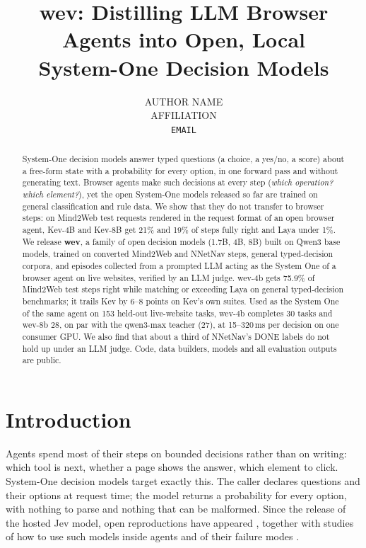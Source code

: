 \documentclass[11pt]{article}
\title{wev: Distilling LLM Browser Agents into Open, Local\\System-One Decision Models}
\author{AUTHOR NAME\\AFFILIATION\\\texttt{EMAIL}}
\date{}
\begin{document}
\maketitle

\begin{abstract}
System-One decision models answer typed questions (a choice, a yes/no, a score) about a free-form state with a
probability for every option, in one forward pass and without generating text. Browser agents make such decisions at
every step (\emph{which operation? which element?}), yet the open System-One models released so far are trained on
general classification and rule data. We show that they do not transfer to browser steps: on Mind2Web test requests
rendered in the request format of an open browser agent, Kev-4B and Kev-8B get 21\% and 19\% of steps fully right and
Laya under 1\%. We release \textbf{wev}, a family of open decision models (1.7B, 4B, 8B) built on Qwen3 base models,
trained on converted Mind2Web and NNetNav steps, general typed-decision corpora, and episodes collected from a
prompted LLM acting as the System One of a browser agent on live websites, verified by an LLM judge. wev-4b gets
75.9\% of Mind2Web test steps right while matching or exceeding Laya on general typed-decision benchmarks; it trails
Kev by 6--8 points on Kev's own suites. Used as the System One of the same agent on 153 held-out live-website tasks,
wev-4b completes 30 tasks and wev-8b 28, on par with the qwen3-max teacher (27), at 15--320\,ms per decision on one
consumer GPU. We also find that about a third of NNetNav's DONE labels do not hold up under an LLM judge. Code, data
builders, models and all evaluation outputs are public.
\end{abstract}

\section{Introduction}

Agents spend most of their steps on bounded decisions rather than on writing: which tool is next, whether a page shows
the answer, which element to click. System-One decision models \citep{jev} target exactly this. The caller declares
questions and their options at request time; the model returns a probability for every option, with nothing to parse
and nothing that can be malformed. Since the release of the hosted Jev model, open reproductions have appeared
\citep{kev,laya,thisthat}, together with studies of how to use such models inside agents \citep{reflex} and of their
failure modes \citep{typesafe}.
\end{document}
